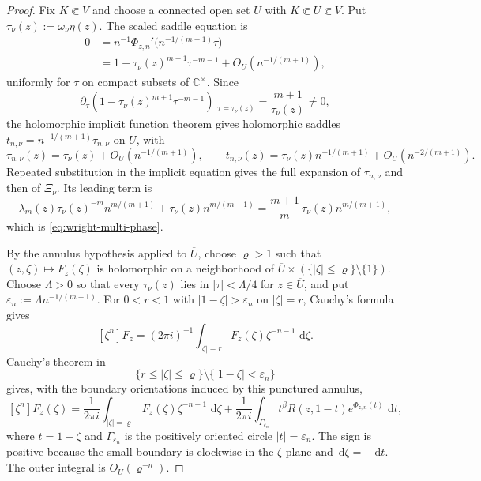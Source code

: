 \documentclass[reqno]{article}
\theoremstyle{definition}
\theoremstyle{remark}
\theoremstyle{plain}
\newcommand{\C}{\mathbb C}
\newcommand{\dd}{\,\mathrm d}
\begin{document}
\begin{proof}
Fix $K\Subset V$ and choose a connected open set $U$ with $K\Subset U\Subset V$. Put $\tau_\nu(z):=\omega_\nu\eta(z)$. The scaled saddle equation is
\begin{align*}
0
&=n^{-1}\Phi_{z,n}'\!\bigl(n^{-1/(m+1)}\tau\bigr)\\
&=1-\tau_\nu(z)^{m+1}\tau^{-m-1}+O_U\!\left(n^{-1/(m+1)}\right),
\end{align*}
uniformly for $\tau$ on compact subsets of $\C^\times$. Since
$$\partial_\tau\!\left(1-\tau_\nu(z)^{m+1}\tau^{-m-1}\right)\Big|_{\tau=\tau_\nu(z)}=\frac{m+1}{\tau_\nu(z)}\ne0,$$
the holomorphic implicit function theorem gives holomorphic saddles $t_{n,\nu}=n^{-1/(m+1)}\tau_{n,\nu}$ on $U$, with
$$\tau_{n,\nu}(z)=\tau_\nu(z)+O_U\!\left(n^{-1/(m+1)}\right),
\qquad
 t_{n,\nu}(z)=\tau_\nu(z)n^{-1/(m+1)}+O_U\!\left(n^{-2/(m+1)}\right).$$
Repeated substitution in the implicit equation gives the full expansion of $\tau_{n,\nu}$ and then of $\Xi_\nu$. Its leading term is
$$\lambda_m(z)\tau_\nu(z)^{-m}n^{m/(m+1)}+\tau_\nu(z)n^{m/(m+1)}
=\frac{m+1}{m}\,\tau_\nu(z)n^{m/(m+1)},$$
which is \eqref{eq:wright-multi-phase}.

By the annulus hypothesis applied to $\overline U$, choose $\varrho>1$ such that $(z,\zeta)\mapsto F_z(\zeta)$ is holomorphic on a neighborhood of $\overline U\times(\{|\zeta|\le\varrho\}\setminus\{1\})$. Choose $\Lambda>0$ so that every $\tau_\nu(z)$ lies in $|\tau|<\Lambda/4$ for $z\in\overline U$, and put $\varepsilon_n:=\Lambda n^{-1/(m+1)}$. For $0<r<1$ with $|1-\zeta|>\varepsilon_n$ on $|\zeta|=r$, Cauchy's formula gives
$$[\zeta^n]F_z=(2\pi i)^{-1}\int_{|\zeta|=r}F_z(\zeta)\zeta^{-n-1}\,\dd\zeta.$$
Cauchy's theorem in
$$\{r\le |\zeta|\le\varrho\}\setminus\{|1-\zeta|<\varepsilon_n\}$$
gives, with the boundary orientations induced by this punctured annulus,
\begin{equation}\label{eq:wright-contour-split}
[\zeta^n]F_z(\zeta)=\frac{1}{2\pi i}\int_{|\zeta|=\varrho}F_z(\zeta)\zeta^{-n-1}\,\dd\zeta
+\frac{1}{2\pi i}\int_{\Gamma_{\varepsilon_n}} t^\beta R(z,1-t)e^{\Phi_{z,n}(t)}\,\dd t,
\end{equation}
where $t=1-\zeta$ and $\Gamma_{\varepsilon_n}$ is the positively oriented circle $|t|=\varepsilon_n$. The sign is positive because the small boundary is clockwise in the $\zeta$-plane and $\dd\zeta=-\dd t$. The outer integral is $O_U(\varrho^{-n})$.


\end{proof}
\end{document}
